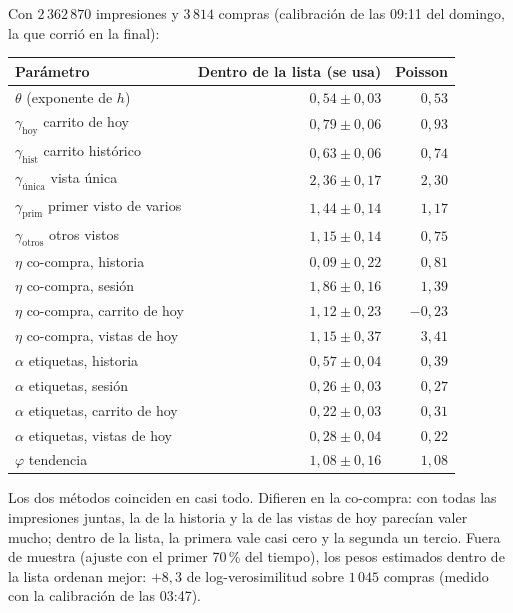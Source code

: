 \documentclass[11pt,a4paper]{article}
\begin{document}
Con $2\,362\,870$ impresiones y $3\,814$ compras (calibración de las 09:11 del domingo, la que corrió en la final):

\begin{center}
\small
\begin{tabular}{lrr}
\toprule
Parámetro & Dentro de la lista (se usa) & Poisson\\
\midrule
$\theta$ (exponente de $h$) & $0{,}54\pm0{,}03$ & $0{,}53$\\
$\gamma_{\text{hoy}}$ carrito de hoy & $0{,}79\pm0{,}06$ & $0{,}93$\\
$\gamma_{\text{hist}}$ carrito histórico & $0{,}63\pm0{,}06$ & $0{,}74$\\
$\gamma_{\text{única}}$ vista única & $2{,}36\pm0{,}17$ & $2{,}30$\\
$\gamma_{\text{prim}}$ primer visto de varios & $1{,}44\pm0{,}14$ & $1{,}17$\\
$\gamma_{\text{otros}}$ otros vistos & $1{,}15\pm0{,}14$ & $0{,}75$\\
$\eta$ co-compra, historia & $0{,}09\pm0{,}22$ & $0{,}81$\\
$\eta$ co-compra, sesión & $1{,}86\pm0{,}16$ & $1{,}39$\\
$\eta$ co-compra, carrito de hoy & $1{,}12\pm0{,}23$ & $-0{,}23$\\
$\eta$ co-compra, vistas de hoy & $1{,}15\pm0{,}37$ & $3{,}41$\\
$\alpha$ etiquetas, historia & $0{,}57\pm0{,}04$ & $0{,}39$\\
$\alpha$ etiquetas, sesión & $0{,}26\pm0{,}03$ & $0{,}27$\\
$\alpha$ etiquetas, carrito de hoy & $0{,}22\pm0{,}03$ & $0{,}31$\\
$\alpha$ etiquetas, vistas de hoy & $0{,}28\pm0{,}04$ & $0{,}22$\\
$\varphi$ tendencia & $1{,}08\pm0{,}16$ & $1{,}08$\\
\bottomrule
\end{tabular}
\end{center}

Los dos métodos coinciden en casi todo. Difieren en la co-compra: con todas las impresiones juntas, la de
la historia y la de las vistas de hoy parecían valer mucho; dentro de la lista, la primera vale casi cero y la
segunda un tercio. Fuera de muestra (ajuste con el primer 70\,\% del tiempo), los pesos estimados dentro
de la lista ordenan mejor: $+8{,}3$ de log-verosimilitud sobre $1\,045$ compras (medido con la calibración de las 03:47).
\end{document}
